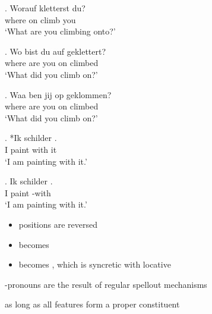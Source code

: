 \documentclass[xcolor=dvipsnames,10pt]{beamer}
\begin{document}
\begin{frame}

\exg. Worauf kletterst du?\\
 {where on} climb you\\
 `What are you climbing onto?'

\exg. Wo bist du auf geklettert?\\
 where are you on climbed\\
 `What did you climb on?'

\pause

\exg. Waa ben jij op geklommen?\\
 where are you on climbed\\
 `What did you climb on?'


\end{frame}


\begin{frame}

\exg. *Ik schilder  .\\
 I paint with it\\
 `I am painting with it.'

\pause

\exg. Ik schilder  .\\
 I paint  -with\\
 `I am painting with it.'\label{ex:jarmee}

\end{frame}


\begin{frame}


\vspace{3em} \citep{riemsdijk1978}


\end{frame}


\begin{frame}


\vspace{1em}

\pause

\begin{itemize}
\item positions are reversed \pause
\item {} becomes  \pause
\item {} becomes , which is syncretic with locative \citep{koopman1994}
\end{itemize}

\vspace{1em}\pause

-pronouns are the result of regular spellout mechanisms

\pause

as long as all features form a proper constituent

\end{frame}
\end{document}
